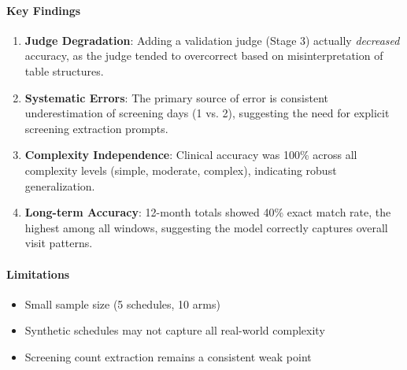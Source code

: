 \paragraph{Key Findings}
\begin{enumerate}
    \item \textbf{Judge Degradation}: Adding a validation judge (Stage 3) actually \textit{decreased} accuracy, as the judge tended to overcorrect based on misinterpretation of table structures.
    
    \item \textbf{Systematic Errors}: The primary source of error is consistent underestimation of screening days (1 vs. 2), suggesting the need for explicit screening extraction prompts.
    
    \item \textbf{Complexity Independence}: Clinical accuracy was 100\% across all complexity levels (simple, moderate, complex), indicating robust generalization.
    
    \item \textbf{Long-term Accuracy}: 12-month totals showed 40\% exact match rate, the highest among all windows, suggesting the model correctly captures overall visit patterns.
\end{enumerate}

\paragraph{Limitations}
\begin{itemize}
    \item Small sample size (5 schedules, 10 arms)
    \item Synthetic schedules may not capture all real-world complexity
    \item Screening count extraction remains a consistent weak point
\end{itemize}

